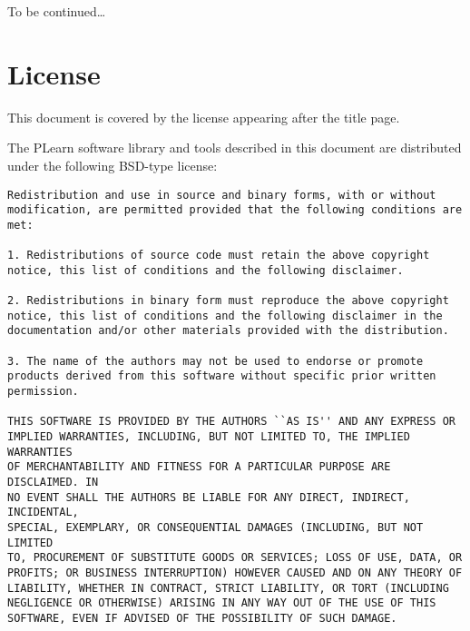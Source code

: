 \documentclass[11pt]{book}
\begin{document}
To be continued\ldots





\chapter*{License}

This document is covered by the license appearing after the title page.

The PLearn software library and tools described in this document are
distributed under the following BSD-type license:

\begin{verbatim}
Redistribution and use in source and binary forms, with or without
modification, are permitted provided that the following conditions are met:

1. Redistributions of source code must retain the above copyright
notice, this list of conditions and the following disclaimer.

2. Redistributions in binary form must reproduce the above copyright
notice, this list of conditions and the following disclaimer in the
documentation and/or other materials provided with the distribution.

3. The name of the authors may not be used to endorse or promote
products derived from this software without specific prior written
permission.

THIS SOFTWARE IS PROVIDED BY THE AUTHORS ``AS IS'' AND ANY EXPRESS OR
IMPLIED WARRANTIES, INCLUDING, BUT NOT LIMITED TO, THE IMPLIED WARRANTIES
OF MERCHANTABILITY AND FITNESS FOR A PARTICULAR PURPOSE ARE DISCLAIMED. IN
NO EVENT SHALL THE AUTHORS BE LIABLE FOR ANY DIRECT, INDIRECT, INCIDENTAL,
SPECIAL, EXEMPLARY, OR CONSEQUENTIAL DAMAGES (INCLUDING, BUT NOT LIMITED
TO, PROCUREMENT OF SUBSTITUTE GOODS OR SERVICES; LOSS OF USE, DATA, OR
PROFITS; OR BUSINESS INTERRUPTION) HOWEVER CAUSED AND ON ANY THEORY OF
LIABILITY, WHETHER IN CONTRACT, STRICT LIABILITY, OR TORT (INCLUDING
NEGLIGENCE OR OTHERWISE) ARISING IN ANY WAY OUT OF THE USE OF THIS
SOFTWARE, EVEN IF ADVISED OF THE POSSIBILITY OF SUCH DAMAGE.
\end{verbatim}
\end{document}
